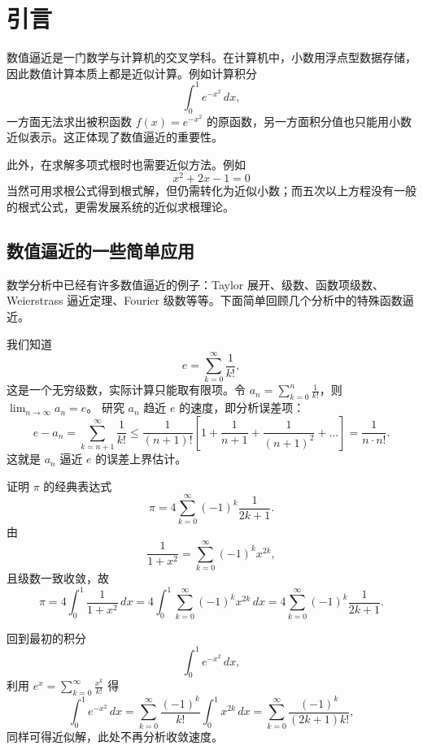 \section{引言}

数值逼近是一门数学与计算机的交叉学科。在计算机中，小数用浮点型数据存储，因此数值计算本质上都是近似计算。例如计算积分
\[
\int_{0}^{1} e^{-x^2}\,dx,
\]
一方面无法求出被积函数 $f(x)=e^{-x^2}$ 的原函数，另一方面积分值也只能用小数近似表示。这正体现了数值逼近的重要性。

此外，在求解多项式根时也需要近似方法。例如
\[
x^2+2x-1=0
\]
当然可用求根公式得到根式解，但仍需转化为近似小数；而五次以上方程没有一般的根式公式，更需发展系统的近似求根理论。

\subsection{数值逼近的一些简单应用}

数学分析中已经有许多数值逼近的例子：Taylor 展开、级数、函数项级数、Weierstrass 逼近定理、Fourier 级数等等。下面简单回顾几个分析中的特殊函数逼近。

\begin{example}
我们知道
\[
e = \sum_{k=0}^{\infty} \frac{1}{k!},
\]
这是一个无穷级数，实际计算只能取有限项。令 $a_n = \sum_{k=0}^{n} \frac{1}{k!}$，则 $\lim_{n\to\infty} a_n = e$。
研究 $a_n$ 趋近 $e$ 的速度，即分析误差项：
\[
e - a_n = \sum_{k=n+1}^{\infty} \frac{1}{k!}
      \le \frac{1}{(n+1)!}\left[1 + \frac{1}{n+1} + \frac{1}{(n+1)^2}+\dots\right]
      = \frac{1}{n\cdot n!}.
\]
这就是 $a_n$ 逼近 $e$ 的误差上界估计。
\end{example}

\begin{example}
证明 $\pi$ 的经典表达式
\[
\pi = 4\sum_{k=0}^{\infty}(-1)^k\frac{1}{2k+1}.
\]
由
\[
\frac{1}{1+x^2} = \sum_{k=0}^{\infty} (-1)^k x^{2k},
\]
且级数一致收敛，故
\[
\pi = 4\int_{0}^{1} \frac{1}{1+x^2}\,dx
    = 4\int_{0}^{1} \sum_{k=0}^{\infty} (-1)^k x^{2k}\,dx
    = 4\sum_{k=0}^{\infty} (-1)^k\frac{1}{2k+1}.
\]
\end{example}

\begin{example}
回到最初的积分
\[
\int_{0}^{1} e^{-x^2}\,dx,
\]
利用 $e^x = \sum_{k=0}^{\infty} \frac{x^k}{k!}$ 得
\[
\int_{0}^{1} e^{-x^2}\,dx = \sum_{k=0}^{\infty} \frac{(-1)^k}{k!} \int_{0}^{1} x^{2k}\,dx
                         = \sum_{k=0}^{\infty} \frac{(-1)^k}{(2k+1)k!},
\]
同样可得近似解，此处不再分析收敛速度。
\end{example}

